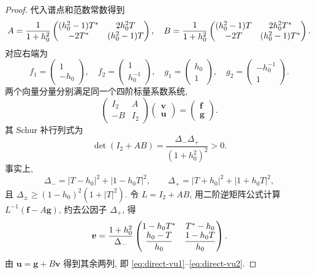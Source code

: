 \begin{proof}
代入谱点和范数常数得到
\begin{equation}\label{eq:one-AB}
A=\dfrac{1}{1+h_0^2}
\begin{pmatrix}(h_0^2-1){T}^{*}&2h_0^2T\\-2{T}^{*}&(h_0^2-1)T\end{pmatrix},\quad
B=\dfrac{1}{1+h_0^2}
\begin{pmatrix}(h_0^2-1)T&2h_0^2{T}^{*}\\-2T&(h_0^2-1){T}^{*}\end{pmatrix}.
\end{equation}
对应右端为
\begin{equation*}
f_1=\begin{pmatrix}1\\-h_0\end{pmatrix},\quad
f_2=\begin{pmatrix}1\\h_0^{-1}\end{pmatrix},\quad
g_1=\begin{pmatrix}h_0\\1\end{pmatrix},\quad
g_2=\begin{pmatrix}-h_0^{-1}\\1\end{pmatrix}.
\end{equation*}
两个向量分量分别满足同一个四阶标量系数系统,
\begin{equation*}
\begin{pmatrix}I_2&A\\-B&I_2\end{pmatrix}
\begin{pmatrix}\boldsymbol v\\\boldsymbol u\end{pmatrix}
=\begin{pmatrix}\boldsymbol f\\\boldsymbol g\end{pmatrix}.
\end{equation*}
其 Schur 补行列式为
\begin{equation}\label{eq:one-schur-det}
\det(I_2+AB)=\dfrac{\Delta_-\Delta_+}{(1+h_0^2)^2}>0.
\end{equation}
事实上,
\begin{equation*}
\Delta_-=|T-h_0|^2+|1-h_0T|^2,\qquad
\Delta_+=|T+h_0|^2+|1+h_0T|^2,
\end{equation*}
且 $\Delta_\pm\ge(1-h_0)^2(1+|T|^2)$. 令 $L=I_2+AB$, 用二阶逆矩阵公式计算 $L^{-1}(\boldsymbol f-A\boldsymbol g)$, 约去公因子 $\Delta_+$, 得
\begin{equation*}
\boldsymbol v=\dfrac{1+h_0^2}{\Delta_-}
\begin{pmatrix}1-h_0{T}^{*}&{T}^{*}-h_0\\
\dfrac{h_0-T}{h_0}&\dfrac{1-h_0T}{h_0}\end{pmatrix}.
\end{equation*}
由 $\boldsymbol u=\boldsymbol g+B\boldsymbol v$ 得到其余两列, 即 \eqref{eq:direct-vu1}--\eqref{eq:direct-vu2}.
\end{proof}

